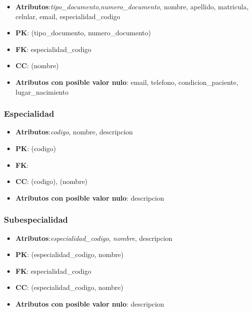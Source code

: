 \documentclass[a4paper,11pt]{article}
\begin{document}
\begin{itemize}

\item 
\textbf{Atributos}:\emph{tipo\_documento},\emph{numero\_documento}, nombre, apellido, matricula, celular, email, especialidad\_codigo

\item 
\textbf{PK}: (tipo\_documento, numero\_documento)

\item
\textbf{FK}: especialidad\_codigo

\item 
\textbf{CC}: (nombre)

\item 
\textbf{Atributos con posible valor nulo}: email, telefono, condicion\_paciente, lugar\_nacimiento

\end{itemize}
\subsubsection{\textbf{Especialidad}}

\begin{itemize}

\item 
\textbf{Atributos}:\emph{codigo}, nombre, descripcion

\item 
\textbf{PK}: (codigo)

\item
\textbf{FK}:

\item 
\textbf{CC}: (codigo), (nombre)

\item 
\textbf{Atributos con posible valor nulo}: descripcion

\end{itemize}
\subsubsection{\textbf{Subespecialidad}}

\begin{itemize}

\item 
\textbf{Atributos}:\emph{especialidad\_codigo}, \emph{nombre}, descripcion

\item 
\textbf{PK}: (especialidad\_codigo, nombre)

\item
\textbf{FK}: especialidad\_codigo

\item 
\textbf{CC}: (especialidad\_codigo, nombre)

\item 
\textbf{Atributos con posible valor nulo}: descripcion

\end{itemize}
\end{document}
